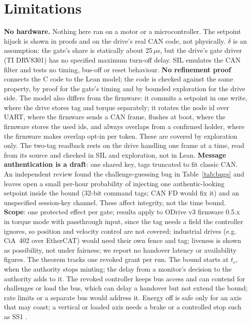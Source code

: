 \documentclass[letterpaper]{article} %
\begin{document}
\section{Limitations}
\label{sec:limits}

\textbf{No hardware.} Nothing here ran on a motor or a microcontroller. The setpoint hijack is
shown in proofs and on the drive's real CAN code, not physically. $\delta$ is an assumption: the
gate's share is statically about 25\,$\mu$s, but the drive's gate driver (TI DRV8301) has no
specified maximum turn-off delay. SIL emulates the CAN filter and tests no timing, bus-off or
reset behaviour. \textbf{No refinement proof} connects the C code to the Lean model; the code is
checked against the same property, by proof for the gate's timing and by bounded exploration for
the drive side. The model also differs from the firmware: it commits a setpoint in one write, where the drive
stores tag and torque separately; it rotates the node id over UART, where
the firmware sends a CAN frame, flushes at boot, where the firmware stores the used ids, and always
overlaps from a confirmed holder, where the firmware makes overlap opt-in per token. These are covered by
exploration only. The two-tag readback rests on the drive handling one frame at a time, read from its source
and checked in SIL and exploration, not in Lean.
\textbf{Message authentication is a draft}: one shared key, tags truncated to fit
classic CAN. An independent review found the challenge-guessing bug in Table~\ref{tab:bugs} and
leaves open a small per-hour probability of injecting one authentic-looking setpoint inside the
bound (32-bit command tags; CAN FD would fix it) and an unspecified session-key channel. These
affect integrity, not the time bound. \textbf{Scope}: one protected effect per gate; results apply
to ODrive v3 firmware 0.5.x in torque mode with passthrough input, since the tag needs a field
the controller ignores, so position and velocity control are not covered; industrial drives
(e.g. CiA~402 over EtherCAT) would need their own fence and tag; liveness is shown as
possibility, not under fairness; we report no handover latency or availability figures. The theorem tracks one revoked grant
per run. The bound starts at $t_c$, when the authority stops minting; the delay from a
monitor's decision to the authority adds to it. The revoked controller keeps bus access and can
contend for challenges or load the bus, which can delay a handover but not extend the bound;
rate limits or a separate bus would address it. Energy off is safe only for an axis that may
coast; a vertical or loaded axis needs a brake or a controlled stop such as SS1
\citep{iec61800}.
\end{document}

